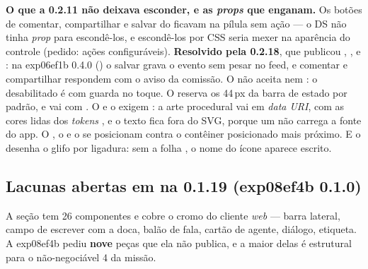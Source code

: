 \begin{atencao}
\textbf{O que a 0.2.11 não deixava esconder, e as \emph{props} que enganam.} Os
botões de comentar, compartilhar e salvar do  ficavam na
pílula sem ação --- o DS não tinha \emph{prop} para escondê-los, e escondê-los por
CSS seria mexer na aparência do controle (pedido: ações configuráveis).
\textbf{Resolvido pela 0.2.18}, que publicou , ,
 e : na exp06ef1b 0.4.0 () o
salvar grava o evento sem pesar no feed, e comentar e compartilhar respondem com o aviso da
comissão. O
 não aceita  nem : o desabilitado é
 com guarda no toque. O  reserva os 44\,px da
barra de estado por padrão, e vai com . O
 e o  exigem : a arte procedural vai em
\emph{data URI}, com as cores lidas dos \emph{tokens} , e o texto
fica fora do SVG, porque um  não carrega a fonte do app. O
, o  e o  se posicionam
contra o contêiner posicionado mais próximo. E o  desenha o
glifo por ligadura: sem a folha , o nome do ícone
aparece escrito.
\end{atencao}

\subsection{Lacunas abertas em  na 0.1.19 (exp08ef4b 0.1.0)}

A seção tem 26 componentes e cobre o cromo do cliente \emph{web} --- barra
lateral, campo de escrever com a doca, balão de fala, cartão de agente, diálogo,
etiqueta. A exp08ef4b pediu \textbf{nove} peças que ela não publica, e a maior
delas é estrutural para o não-negociável 4 da missão.

